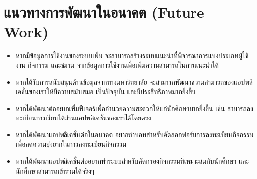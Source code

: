 \documentclass[14pt,oneside,openright,a4paper]{cpe-thai-project}
\begin{document}
\section{แนวทางการพัฒนาในอนาคต (Future Work)}
\begin{itemize}
  \item หากมีข้อมูลการใช้งานของระบบเพิ่ม จะสามารถสร้างระบบแนะนำที่พิจารณาการแบ่งประเภทผู้ใช้งาน กิจกรรม และชมรม จากข้อมูลการใช้งานเพื่อเพิ่มความสามารถในการแนะนำได้
  \item หากได้รับการสนับสนุนด้านข้อมูลจากทางมหาวิทยาลัย จะสามารถพัฒนาความสามารถของแอปพลิเคชั่นของเราให้มีความสม่ำเสมอ เป็นปัจจุบัน และมีประสิทธิภาพมากยิ่งขึ้น
  \item หากได้พัฒนาต่ออยากเพิ่มฟีเจอร์เพื่ออำนวยความสะดวกให้แก่นักศึกษามากยิ่งขึ้น เช่น สามารถลงทะเบียนการเรียนได้ผ่านแอปพลิเคชั่นของเราได้โดยตรง
  \item หากได้พัฒนาแอปพลิเคชั่นต่อในอนาคต อยากทำบอทสำหรับคัดลอกฟอร์มการลงทะเบียนกิจกรรม เพื่อลดความยุ่งยากในการลงทะเบียนกิจกรรม
  \item หากได้พัฒนาแอปพลิเคชั่นต่ออยากทำระบบสำหรับคัดกรองกิจกรรมที่เหมาะสมกับนักศึกษา และนักศึกษาสามารถเข้าร่วมได้จริงๆ
\end{itemize}
\makeatletter
\g@addto@macro{\UrlBreaks}{\UrlOrds}
\makeatother



\end{document}
